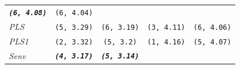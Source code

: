 \documentclass[num-refs]{wiley-article}
\begin{document}
\begin{longtable}[]{@{}lcccc@{}}
\begin{minipage}[t]{0.19\columnwidth}
\textbf{\emph{\texttt{(6,\ 4.08)}}}\strut
\end{minipage} & \begin{minipage}[t]{0.19\columnwidth}\centering\strut
\texttt{(6,\ 4.04)}\strut
\end{minipage}\tabularnewline
\begin{minipage}[t]{0.09\columnwidth}\raggedright\strut
\emph{PLS}\strut
\end{minipage} & \begin{minipage}[t]{0.19\columnwidth}\centering\strut
\texttt{(5,\ 3.29)}\strut
\end{minipage} & \begin{minipage}[t]{0.19\columnwidth}\centering\strut
\texttt{(6,\ 3.19)}\strut
\end{minipage} & \begin{minipage}[t]{0.19\columnwidth}\centering\strut
\texttt{(3,\ 4.11)}\strut
\end{minipage} & \begin{minipage}[t]{0.19\columnwidth}\centering\strut
\texttt{(6,\ 4.06)}\strut
\end{minipage}\tabularnewline
\begin{minipage}[t]{0.09\columnwidth}\raggedright\strut
\emph{PLS1}\strut
\end{minipage} & \begin{minipage}[t]{0.19\columnwidth}\centering\strut
\texttt{(2,\ 3.32)}\strut
\end{minipage} & \begin{minipage}[t]{0.19\columnwidth}\centering\strut
\texttt{(5,\ 3.2)}\strut
\end{minipage} & \begin{minipage}[t]{0.19\columnwidth}\centering\strut
\texttt{(1,\ 4.16)}\strut
\end{minipage} & \begin{minipage}[t]{0.19\columnwidth}\centering\strut
\texttt{(5,\ 4.07)}\strut
\end{minipage}\tabularnewline
\begin{minipage}[t]{0.09\columnwidth}\raggedright\strut
\emph{Senv}\strut
\end{minipage} & \begin{minipage}[t]{0.19\columnwidth}\centering\strut
\textbf{\emph{\texttt{(4,\ 3.17)}}}\strut
\end{minipage} & \begin{minipage}[t]{0.19\columnwidth}\centering\strut
\textbf{\emph{\texttt{(5,\ 3.14)}}}\strut
\end{minipage} & \begin{minipage}[t]{0.19\columnwidth}\centering\strut

\end{minipage}
\end{longtable}
\end{document}
